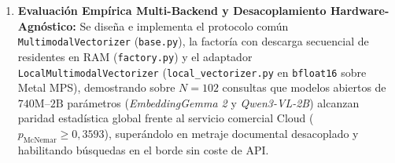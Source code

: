 \begin{enumerate}
    \item \textbf{Evaluación Empírica Multi-Backend y Desacoplamiento Hardware-Agnóstico:} Se diseña e implementa el protocolo común \texttt{MultimodalVectorizer} (\texttt{base.py}), la factoría con descarga secuencial de residentes en RAM (\texttt{factory.py}) y el adaptador \texttt{Local\allowbreak Multimodal\allowbreak Vectorizer} (\texttt{local\_\allowbreak vectorizer.py} en \texttt{bfloat16} sobre Metal MPS), demostrando sobre $N=102$ consultas que modelos abiertos de $740\text{M}$--$2\text{B}$ parámetros (\textit{EmbeddingGemma 2} y \textit{Qwen3-VL-2B}) alcanzan paridad estadística global frente al servicio comercial Cloud ($p_{\text{McNemar}} \ge 0,3593$), superándolo en metraje documental desacoplado y habilitando búsquedas en el borde sin coste de API.
\end{enumerate}
